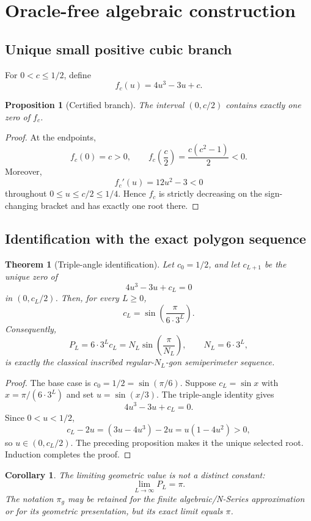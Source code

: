 \documentclass[11pt]{article}
\newtheorem{theorem}{Theorem}
\newtheorem{proposition}{Proposition}
\newtheorem{corollary}{Corollary}
\newcommand{\pig}{\pi_g}
\begin{document}
\section{Oracle-free algebraic construction}

\subsection{Unique small positive cubic branch}

For $0<c\le1/2$, define
\[
 f_c(u)=4u^3-3u+c.
\]

\begin{proposition}[Certified branch]
The interval $(0,c/2)$ contains exactly one zero of $f_c$.
\end{proposition}

\begin{proof}
At the endpoints,
\[
 f_c(0)=c>0,
 \qquad
 f_c\!\left(\frac c2\right)=\frac{c(c^2-1)}2<0.
\]
Moreover,
\[
 f_c'(u)=12u^2-3<0
\]
throughout $0\le u\le c/2\le1/4$.  Hence $f_c$ is strictly decreasing on the sign-changing bracket and has exactly one root there.
\end{proof}

\subsection{Identification with the exact polygon sequence}

\begin{theorem}[Triple-angle identification]
Let $c_0=1/2$, and let $c_{L+1}$ be the unique zero of
\[
 4u^3-3u+c_L=0
\]
in $(0,c_L/2)$.  Then, for every $L\ge0$,
\[
 c_L=\sin\!\left(\frac{\pi}{6\cdot3^L}\right).
\]
Consequently,
\[
 P_L=6\cdot3^L c_L
     =N_L\sin\!\left(\frac{\pi}{N_L}\right),
 \qquad N_L=6\cdot3^L,
\]
is exactly the classical inscribed regular-$N_L$-gon semiperimeter sequence.
\end{theorem}

\begin{proof}
The base case is $c_0=1/2=\sin(\pi/6)$.  Suppose $c_L=\sin x$ with $x=\pi/(6\cdot3^L)$ and set $u=\sin(x/3)$.  The triple-angle identity gives
\[
 4u^3-3u+c_L=0.
\]
Since $0<u<1/2$,
\[
 c_L-2u=(3u-4u^3)-2u=u(1-4u^2)>0,
\]
so $u\in(0,c_L/2)$.  The preceding proposition makes it the unique selected root.  Induction completes the proof.
\end{proof}

\begin{corollary}
The limiting geometric value is not a distinct constant:
\[
 \lim_{L\to\infty}P_L=\pi.
\]
The notation $\pig$ may be retained for the finite algebraic/N-Series approximation or for its geometric presentation, but its exact limit equals $\pi$.
\end{corollary}
\end{document}
